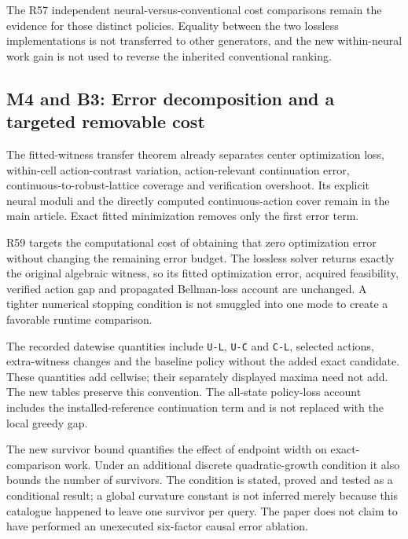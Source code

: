 \documentclass[ecta,nameyear,draft]{econsocart}
\begin{document}
The R57 independent neural-versus-conventional cost comparisons remain
the evidence for those distinct policies. Equality between the two
lossless implementations is not transferred to other generators, and the
new within-neural work gain is not used to reverse the inherited
conventional ranking.

\hypertarget{m4-and-b3-error-decomposition-and-a-targeted-removable-cost}{%
\subsection{M4 and B3: Error decomposition and a targeted removable
cost}\label{m4-and-b3-error-decomposition-and-a-targeted-removable-cost}}

The fitted-witness transfer theorem already separates center
optimization loss, within-cell action-contrast variation,
action-relevant continuation error, continuous-to-robust-lattice
coverage and verification overshoot. Its explicit neural moduli and the
directly computed continuous-action cover remain in the main article.
Exact fitted minimization removes only the first error term.

R59 targets the computational cost of obtaining that zero optimization
error without changing the remaining error budget. The lossless solver
returns exactly the original algebraic witness, so its fitted
optimization error, acquired feasibility, verified action gap and
propagated Bellman-loss account are unchanged. A tighter numerical
stopping condition is not smuggled into one mode to create a favorable
runtime comparison.

The recorded datewise quantities include \nolinkurl{U-L}, \nolinkurl{U-C} and
\nolinkurl{C-L}, selected actions, extra-witness changes and the baseline
policy without the added exact candidate. These quantities add cellwise;
their separately displayed maxima need not add. The new tables preserve
this convention. The all-state policy-loss account includes the
installed-reference continuation term and is not replaced with the local
greedy gap.

The new survivor bound quantifies the effect of endpoint width on
exact-comparison work. Under an additional discrete quadratic-growth
condition it also bounds the number of survivors. The condition is
stated, proved and tested as a conditional result; a global curvature
constant is not inferred merely because this catalogue happened to leave
one survivor per query. The paper does not claim to have performed an
unexecuted six-factor causal error ablation.
\end{document}
